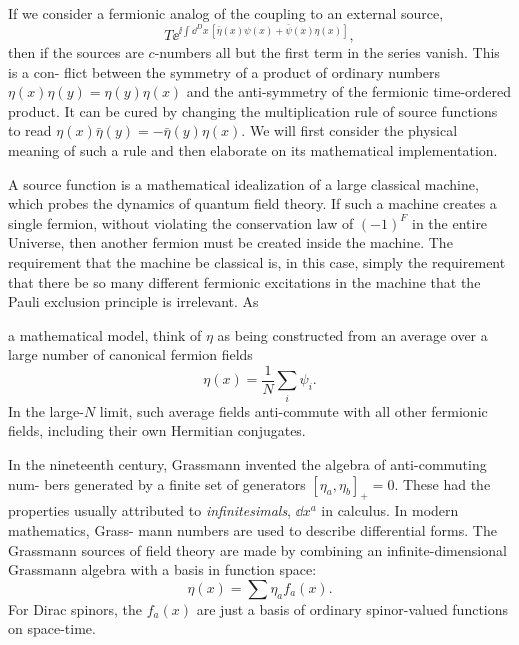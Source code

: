 If we consider a fermionic analog of the coupling to an external source,
\begin{equation*}
    T\ee^{\ii\int\dd^D x\,[\bar\eta(x)\psi(x)+\bar\psi(x)\eta(x)]},
\end{equation*}
then if the sources are $c$-numbers all but the first term in the series vanish. This is a con-
flict between the symmetry of a product of ordinary numbers $\eta(x)\eta(y)=\eta(y)\eta(x)$ and
the anti-symmetry of the fermionic time-ordered product. It can be cured by changing
the multiplication rule of source functions to read $\eta(x)\bar\eta(y)=-\bar\eta(y)\eta(x)$. We will first
consider the physical meaning of such a rule and then elaborate on its mathematical
implementation.

A source function is a mathematical idealization of a large classical machine, which
probes the dynamics of quantum field theory. If such a machine creates a single
fermion, without violating the conservation law of $(-1)^F$ in the entire Universe, then
another fermion must be created inside the machine. The requirement that the machine
be classical is, in this case, simply the requirement that there be so many different
fermionic excitations in the machine that the Pauli exclusion principle is irrelevant. As

a mathematical model, think of $\eta$ as being constructed from an average over a large
number of canonical fermion fields
\begin{equation*}
  \eta(x)=\frac1N\sum_i\psi_i.
\end{equation*}
In the large-$N$ limit, such average fields anti-commute with all other fermionic fields,
including their own Hermitian conjugates.

In the nineteenth century, Grassmann invented the algebra of anti-commuting num-
bers generated by a finite set of generators $[\eta_a,\eta_b]_+=0$. These had the properties
usually attributed to \emph{infinitesimals}, $\dd x^a$ in calculus. In modern mathematics, Grass-
mann numbers are used to describe differential forms. The Grassmann sources of field
theory are made by combining an infinite-dimensional Grassmann algebra with a basis
in function space:
\begin{equation*}
  \eta(x)=\sum\eta_a f_a(x).
\end{equation*}
For Dirac spinors, the $f_a(x)$ are just a basis of ordinary spinor-valued functions on space-time.


